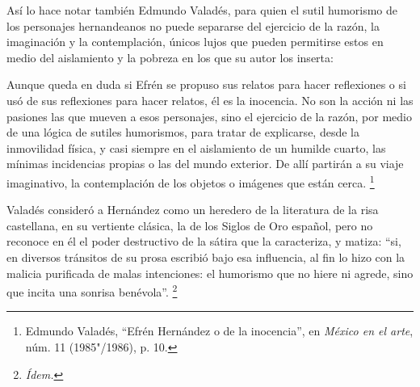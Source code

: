 \documentclass[14pt,twoside,final]{extbook} %
\let\oldfootnote\footnote
\renewcommand\footnote[1]{%
\oldfootnote{\hspace{1mm}#1}}
\begin{document}
Así lo hace notar también Edmundo Valadés, para quien el sutil humorismo de los personajes hernandeanos no puede separarse del ejercicio de la razón, la imaginación y la contemplación, únicos lujos que pueden permitirse estos en medio del aislamiento y la pobreza en los que su autor los inserta:
\begin{quoting}
Aunque queda en duda si Efrén se propuso sus relatos para hacer reflexiones o si usó de sus reflexiones para hacer relatos, él es la inocencia. No son la acción ni las pasiones las que mueven a esos personajes, sino el ejercicio de la razón, por medio de una lógica de sutiles humorismos, para tratar de explicarse, desde la inmovilidad física, y casi siempre en el aislamiento de un humilde cuarto, las mínimas incidencias propias o las del mundo exterior. De allí partirán a su viaje imaginativo, la contemplación de los objetos o imágenes que están cerca.\footnote{Edmundo Valadés, ``Efrén Hernández o de la inocencia'', en \emph{México en el arte}, núm. 11 (1985"/1986), p. 10.}
\end{quoting}
Valadés consideró a Hernández como un heredero de la literatura de la risa castellana, en su vertiente clásica, la de los Siglos de Oro español, pero no reconoce en él el poder destructivo de la sátira que la caracteriza, y matiza: ``si, en diversos tránsitos de su prosa escribió bajo esa influencia, al fin lo hizo con la malicia purificada de malas intenciones: el humorismo que no hiere ni agrede, sino que incita una sonrisa benévola''.\footnote{\em Ídem.}
\end{document}

